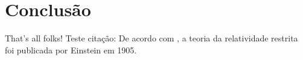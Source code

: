 \chapter{Conclusão}
That's all folks!
Teste citação: De acordo com \cite{einstein1905}, a teoria da relatividade restrita foi publicada por Einstein em 1905.
